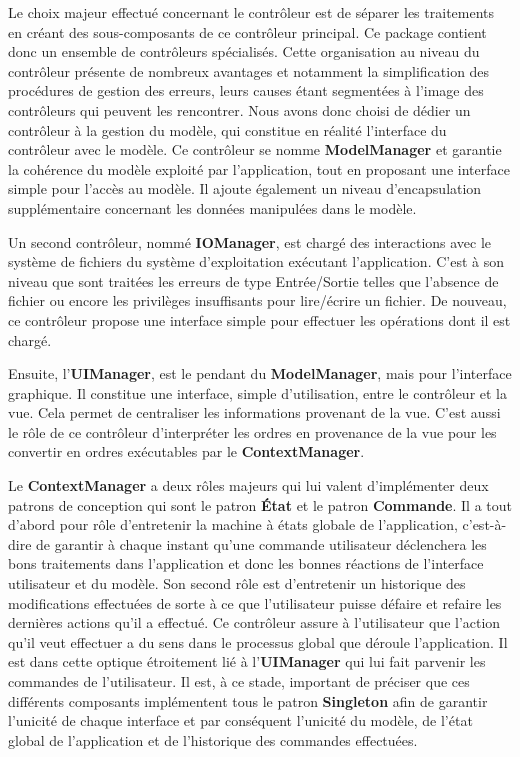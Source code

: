 \documentclass[paper=a4, fontsize=11pt]{report}
\numberwithin{equation}{section}		%
\numberwithin{figure}{section}		%
\numberwithin{table}{section}		%
\renewcommand{\bf}[1]{\textbf{#1}}
\begin{document}
Le choix majeur effectué concernant le contrôleur est de séparer les traitements en créant des sous-composants de ce contrôleur principal. Ce package contient donc un ensemble de  contrôleurs spécialisés. Cette organisation au niveau du contrôleur présente de nombreux avantages et notamment la simplification des procédures de gestion des erreurs, leurs causes étant segmentées à l'image des contrôleurs qui peuvent les rencontrer. 
Nous avons donc choisi de dédier un contrôleur à la gestion du modèle, qui constitue en réalité l'interface du contrôleur avec le modèle. Ce contrôleur se nomme \bf{ModelManager} et garantie la cohérence du modèle exploité par l'application, tout en proposant une interface simple pour l'accès au modèle. Il ajoute également un niveau d'encapsulation supplémentaire concernant les données manipulées dans le modèle. 

Un second contrôleur, nommé \bf{IOManager}, est chargé des interactions avec le système de fichiers du système d'exploitation exécutant l'application. C’est à son niveau que sont traitées les erreurs de type Entrée/Sortie telles que l'absence de fichier ou encore les privilèges insuffisants pour lire/écrire un fichier. De nouveau, ce contrôleur propose une interface simple pour effectuer les opérations dont il est chargé. 

Ensuite, l'\bf{UIManager}, est le pendant du \bf{ModelManager}, mais pour l'interface graphique. Il constitue une interface, simple d'utilisation, entre le contrôleur et la vue. Cela permet de centraliser les informations provenant de la vue. C'est aussi le rôle de ce contrôleur d'interpréter les ordres en provenance de la vue pour les convertir en ordres exécutables par le \bf{ContextManager}. 

Le \bf{ContextManager} a deux rôles majeurs qui lui valent d'implémenter deux patrons de conception qui sont le patron \bf{État} et le patron \bf{Commande}. Il a tout d'abord pour rôle d'entretenir la machine à états globale de l'application, c'est-à-dire de garantir à chaque instant qu'une commande utilisateur déclenchera les bons traitements dans l'application et donc les bonnes réactions de l'interface utilisateur et du modèle. Son second rôle est d'entretenir un historique des modifications effectuées de sorte à ce que l'utilisateur puisse défaire et refaire les dernières actions qu'il a effectué. Ce contrôleur assure à l'utilisateur que l'action qu'il veut effectuer a du sens dans le processus global que déroule l'application. Il est dans cette optique étroitement lié à l'\bf{UIManager} qui lui fait parvenir les commandes de l'utilisateur.
Il est, à ce stade, important de préciser que ces différents composants implémentent tous le patron \bf{Singleton} afin de garantir l'unicité de chaque interface et par conséquent l'unicité du modèle, de l'état global de l'application et de l'historique des commandes effectuées.
\end{document}
